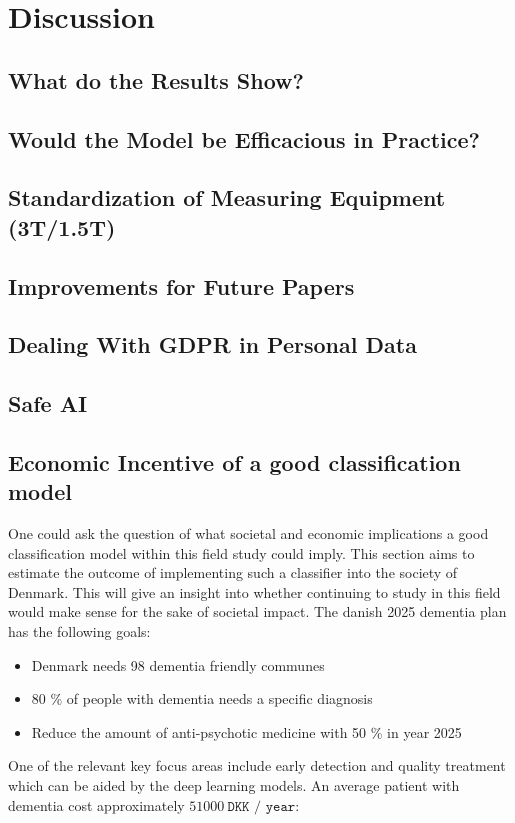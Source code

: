 \documentclass[12pt, fleqn, titlepage]{article}
\begin{document}
\section{Discussion}\label{discussion}


\subsection{What do the Results Show?}\label{discussionOfResults}

\subsection{Would the Model be Efficacious in Practice?}


\subsection{Standardization of Measuring Equipment (3T/1.5T)}

\subsection{Improvements for Future Papers}


\subsection{Dealing With GDPR in Personal Data}


\subsection{Safe AI}

\subsection{Economic Incentive of a good classification model}

One could ask the question of what societal and economic implications a good classification model within this field study could imply. This section aims to estimate the outcome of implementing such a classifier into the society of Denmark. This will give an insight into whether continuing to study in this field would make sense for the sake of societal impact. The danish 2025 dementia plan has the following goals:

\begin{itemize}
	\item Denmark needs 98 dementia friendly communes
	\item 80 \% of people with dementia needs a specific diagnosis 
	\item Reduce the amount of anti-psychotic medicine with 50 \% in year 2025
\end{itemize}
\noindent
One of the relevant key focus areas include early detection and quality treatment which can be aided by the deep learning models. An average patient with dementia cost approximately $ 51000 \ \texttt{DKK / year}$:
\end{document}
